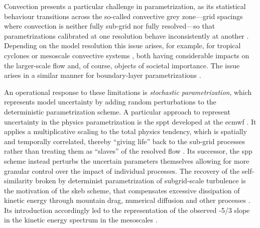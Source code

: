 Convection presents a particular challenge in parametrization,
as its statistical behaviour transitions across
the so-called convective grey zone---grid spacings where convection is
neither fully sub-grid nor fully resolved---so that parametrizations
calibrated at one resolution behave inconsistently at another
\parencite{bechtoldRoleShallowConvection2014, fieldExploringConvectiveGrey2017,
    tomassiniConfrontingConvectiveGray2023,
    krollParameterizationAdaptionNeeded2025}.
Depending on the model resolution this issue arises, for example, for tropical
cyclones \parencite{langImpactPerturbationMethods2012} or mesoscale
convective systems \parencite{clarkeDownstreamInfluenceMesoscale2019}, both
having considerable impacts on the larger-scale flow and, of course, objects of
societal importance. The issue arises in a similar manner for boundary-layer
parametrizations \parencite{honnertAtmosphericBoundaryLayer2020}.

An operational response to these limitations is \emph{stochastic
    parametrization}, which represents model uncertainty by adding random
perturbations to the deterministic parametrization scheme. A particular
approach to represent uncertainty in the physics parametrization is the
\gls{sppt} developed at the \gls{ecmwf}
\parencite{buizzaStochasticRepresentationModel1999,
    leutbecherStochasticRepresentationsModel2017}. It applies a multiplicative
scaling to the total physics tendency, which is spatially and temporally
correlated, thereby \enquote{giving life} back to the sub-grid processes rather than
treating them as \enquote{slaves} of the resolved flow
\parencite{palmerStochasticWeatherClimate2019}. Its successor, the \gls{spp}
scheme \parencite{ollinahoProcesslevelRepresentationModel2017,
    langRevisionStochasticallyPerturbed2021} instead perturbs the uncertain
parameters themselves allowing for more granular control over the impact
of individual processes. The recovery of the self-similarity broken by
determinist parametrization of subgrid-scale turbulence is the motivation of
the \gls{skeb} scheme, that compensates excessive dissipation of kinetic energy
through mountain drag, numerical diffusion and other processes
\parencite{shuttsKineticEnergyBackscatter2005,
    bernerSpectralStochasticKinetic2009}. Its introduction accordingly led to the
representation of the observed -5/3 slope in the kinetic energy spectrum in
the mesoscales \parencite{palmerRepresentingModelUncertainty2005}.

